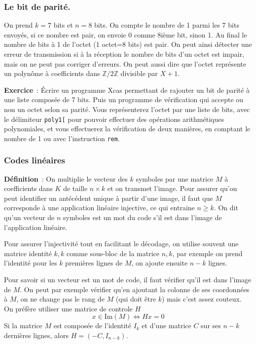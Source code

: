 \documentclass[a4paper,11pt]{article}
\begin{document}
\begin{giacjshere}
\subsubsection{Le bit de parit\'e.}
On prend $k=7$ bits et $n=8$ bits. On compte
le nombre de 1 parmi les 7 bits envoy\'es, si ce nombre est pair, 
on envoie 0 comme 8i\`eme bit, sinon 1. 
Au final le nombre de bits \`a 1 de l'octet (1 octet=8 bits)
est pair. On peut ainsi d\'etecter une erreur de transmission si
\`a la r\'eception le nombre de bits d'un octet est impair, mais on
ne peut pas corriger d'erreurs.
On peut aussi dire que l'octet
repr\'esente un polyn\^ome \`a coefficients dans $\mathbb{Z}/2\mathbb{Z}$ divisible
par $X+1$.

{\bf Exercice}~:
\'Ecrire un programme Xcas permettant de rajouter un bit de parité
à une liste composée de 7 bits. Puis un programme de vérification
qui accepte ou non un octet selon sa parité. Vous représenterez
l'octet par une liste de bits, avec le délimiteur \verb|poly1[|
pour pouvoir effectuer des opérations arithmétiques polynomiales,
et vous effectuerez la vérification de deux manières, en comptant
le nombre de 1 ou avec l'instruction \verb|rem|.

\subsubsection{Codes lin\'eaires}
{\bf D\'efinition}~:
On multiplie le vecteur des $k$ symboles par
une matrice $M$ à coefficients dans $K$ de taille $n \times k$
et on transmet l'image.
Pour assurer qu'on peut identifier un antécédent
unique à partir d'une image, il faut que $M$ corresponde 
à une application linéaire injective, ce qui entraine $n\geq k$. 
On dit qu'un vecteur de $n$ symboles est un mot du code 
s'il est dans l'image de l'application lin\'eaire.

Pour assurer l'injectivité tout en facilitant le décodage, 
on utilise souvent une matrice identité $k,k$ comme sous-bloc
de la matrice $n,k$, par exemple on prend l'identité pour
les $k$ premières lignes de $M$, on ajoute ensuite $n-k$ lignes.

Pour savoir si un vecteur est un mot de code, il faut vérifier
qu'il est dans l'image de $M$. On peut par exemple vérifier
qu'en ajoutant la colonne de ses coordonnées à $M$, on ne change
pas le rang de $M$ (qui doit être $k$) mais c'est assez couteux.
On pr\'ef\`ere utiliser une matrice de controle $H$
$$ x \in \mbox{Im}(M) \Leftrightarrow Hx=0$$
Si la matrice $M$ est compos\'ee de l'identit\'e $I_{k}$
et d'une matrice $C$ sur ses $n-k$ derni\`eres lignes, 
alors $H=(-C,I_{n-k})$.


\end{giacjshere}
\end{document}

